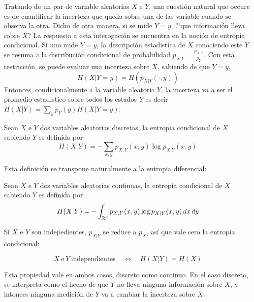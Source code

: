 
\label{s:SZ:Mutua}

Tratando de un par de variable  aleatorias $X$ e $Y$, una cuesti\'on natural que
occure es de cuantificar la incerteza que queda sobre una de las variable cuando
se  observa  la  otra.  Dicho  de  otra  manera, si  se  mide  $Y  =  y$,  ?`que
informaci\'on lleva sobre  $X$? La respuesta a esta  interogaci\'on se encuentra
en la  noci\'on de entropia condicional. Si  uno mide $Y =  y$, la descripci\'on
estadistica de $X$ conociendo este $Y$ se resuma a la distribuci\'on condicional
de  probabilidad $p_{X|Y}  = \frac{p_{X,Y}}{p_Y}$.   Con esta  restricci\'on, se
puede  evaluar una  incerteza sobre  $X$, sabiendo  de que  $Y=y$,
%
\[
H(X|Y=y) = H\left( p_{X|Y}(\cdot,y) \right)
\]
%
Entonces, condicionalmente a la variable aleatoria $Y$, la incerteza va a ser el
promedio  estadistico sobre  todos los  estados $Y$  es decir  $H(X|Y)  = \sum_y
p_Y(y) H(X|Y=y)$:
%
\begin{definicion}\label{def:SZ:entropiacondicional}
  Sean $X$ e $Y$ dos  variables aleatorias discretas, la entropia condicional de
  $X$ sabiendo  $Y$ es  definida por
  \[
  H(X|Y) = - \sum_{x,y} p_{X,Y}(x,y) \log p_{X|Y}(x,y)
  \]
\end{definicion}
%
Esta definici\'on se transpone naturalmente a la entropia diferencial:
%
\begin{definicion}\label{def:SZ:entropiadiferencialcondicional}
  Sean $X$ e $Y$ dos  variables aleatorias continuas, la entropia condicional de
  $X$ sabiendo $Y$ es definida por
  \[
  H(X|Y) = - \int_{\mathbb{R}^d} p_{X,Y}(x,y) \log p_{X|Y}(x,y) \, dx \, dy
  \]
\end{definicion}

Si $X$ e $Y$ son indepedientes, $p_{X|Y}$ se reduce a $p_X$, as\'i que vale cero
la entropia condicional:
%
\begin{propiedades}
\item\label{prop:SZ:independenciacondicional}
  \[
  X \: \mbox{e} \: Y \: \mbox{independientes} \quad \Leftrightarrow \quad H(X|Y)
  = H(X)
  \]
\end{propiedades}
%
Esta  propiedad  vale  en ambos  casos,  discreto  como  continuo.  En  el  caso
discreto, se interpreta como el hecho  de que $Y$ no lleva ninguna informaci\'on
sobre $X$, y intonces ninguna medici\'on  de $Y$ va a cambiar la incerteza sobre
$X$.

